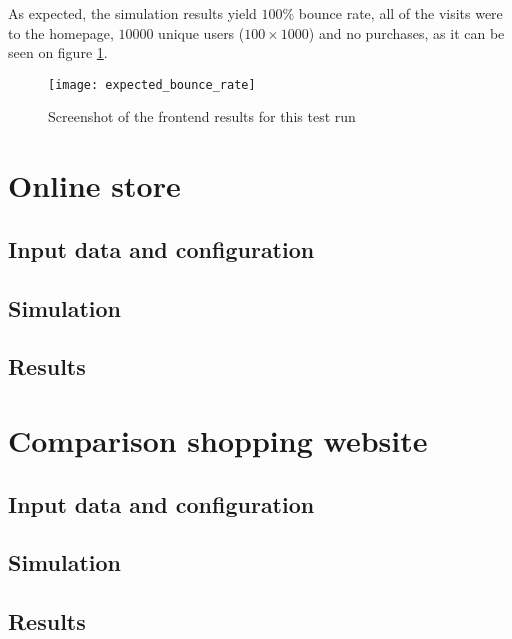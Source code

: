 As expected, the simulation results yield $100\%$ bounce rate, all of the 
visits were to the homepage, $10000$ unique users ($100 \times 1000$) and no 
purchases, as it can be seen on figure \ref{fig:test3result}.

\begin{figure}[h]
    \begin{center}
        \leavevmode
        \texttt{[image: expected\_bounce\_rate]}
        \caption{Screenshot of the frontend results for this test run}
        \label{fig:test3result}
    \end{center}
\end{figure}


\section{Online store}

\subsection{Input data and configuration}
\subsection{Simulation}
\subsection{Results}

\section{Comparison shopping website}

\subsection{Input data and configuration}
\subsection{Simulation}
\subsection{Results}
